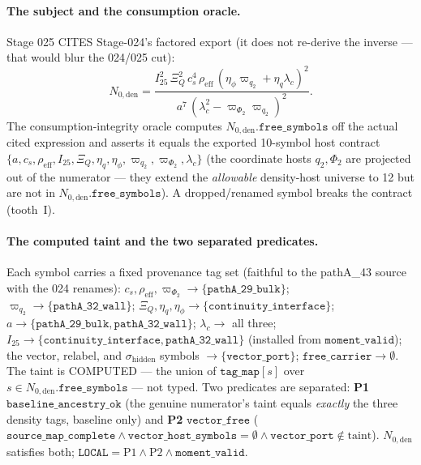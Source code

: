 \paragraph{The subject and the consumption oracle.}
Stage 025 CITES Stage-024's factored export (it does not re-derive the inverse --- that would blur the
024/025 cut):
\[
  N_{0,\mathrm{den}}=\frac{I_{25}^2\,\Xi_Q^2\,c_s^4\,\rho_{\mathrm{eff}}\,(\eta_\phi\varpi_{q_2}+\eta_q\lambda_c)^2}
        {a^7\,(\lambda_c^2-\varpi_{\Phi_2}\varpi_{q_2})^2}.
\]
The consumption-integrity oracle computes \(N_{0,\mathrm{den}}.\texttt{free\_symbols}\) off the actual
cited expression and asserts it equals the exported 10-symbol host contract
\(\{a,c_s,\rho_{\mathrm{eff}},I_{25},\Xi_Q,\eta_q,\eta_\phi,\varpi_{q_2},\varpi_{\Phi_2},\lambda_c\}\)
(the coordinate hosts \(q_2,\Phi_2\) are projected out of the numerator --- they extend the
\emph{allowable} density-host universe to 12 but are not in \(N_{0,\mathrm{den}}.\texttt{free\_symbols}\)).
A dropped/renamed symbol breaks the contract (tooth~I).

\paragraph{The computed taint and the two separated predicates.}
Each symbol carries a fixed provenance tag set (faithful to the pathA\_43 source with the 024 renames):
\(c_s,\rho_{\mathrm{eff}},\varpi_{\Phi_2}\to\{\texttt{pathA\_29\_bulk}\}\);
\(\varpi_{q_2}\to\{\texttt{pathA\_32\_wall}\}\);
\(\Xi_Q,\eta_q,\eta_\phi\to\{\texttt{continuity\_interface}\}\);
\(a\to\{\texttt{pathA\_29\_bulk},\texttt{pathA\_32\_wall}\}\);
\(\lambda_c\to\) all three; \(I_{25}\to\{\texttt{continuity\_interface},\texttt{pathA\_32\_wall}\}\)
(installed from \(\texttt{moment\_valid}\)); the vector, relabel, and \(\sigma_{\mathrm{hidden}}\) symbols
\(\to\{\texttt{vector\_port}\}\); \(\texttt{free\_carrier}\to\emptyset\). The taint is COMPUTED --- the
union of \(\texttt{tag\_map}[s]\) over \(s\in N_{0,\mathrm{den}}.\texttt{free\_symbols}\) --- not typed.
Two predicates are separated: \textbf{P1} \(\texttt{baseline\_ancestry\_ok}\) (the genuine numerator's
taint equals \emph{exactly} the three density tags, baseline only) and \textbf{P2}
\(\texttt{vector\_free}\) (\(\texttt{source\_map\_complete}\wedge\texttt{vector\_host\_symbols}=\emptyset
\wedge\texttt{vector\_port}\notin\text{taint}\)). \(N_{0,\mathrm{den}}\) satisfies both;
\(\texttt{LOCAL}=\text{P1}\wedge\text{P2}\wedge\texttt{moment\_valid}\).


